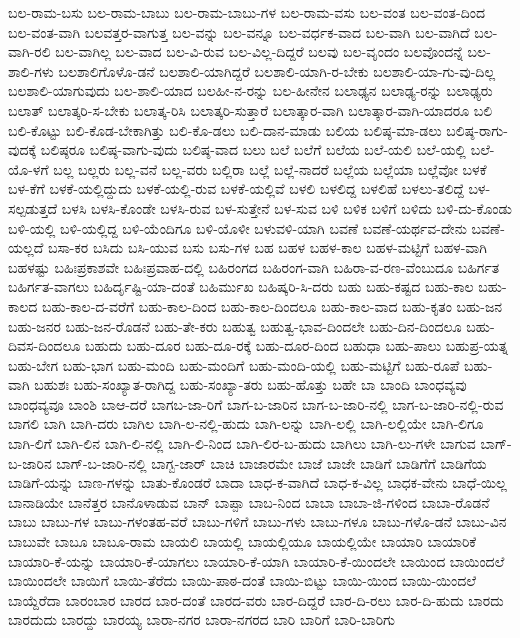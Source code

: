{ಬಲ-ರಾಮ-ಬಸು
ಬಲ-ರಾಮ-ಬಾಬು
ಬಲ-ರಾಮ-ಬಾಬು-ಗಳ
ಬಲ-ರಾಮ-ವಸು
ಬಲ-ವಂತ
ಬಲ-ವಂತ-ದಿಂದ
ಬಲ-ವಂತ-ವಾಗಿ
ಬಲವತ್ತರ-ವಾಗುತ್ತ
ಬಲ-ವನ್ನು
ಬಲ-ವನ್ನೂ
ಬಲ-ವರ್ಧಕ-ವಾದ
ಬಲ-ವಾಗಿ
ಬಲ-ವಾಗಿದೆ
ಬಲ-ವಾಗಿ-ರಲಿ
ಬಲ-ವಾಗಿಲ್ಲ
ಬಲ-ವಾದ
ಬಲ-ವಿ-ರುವ
ಬಲ-ವಿಲ್ಲ-ದಿದ್ದರೆ
ಬಲವು
ಬಲ-ವೃಂದಂ
ಬಲವೊಂದನ್ನೆ
ಬಲ-ಶಾಲಿ-ಗಳು
ಬಲಶಾಲಿಗೊಳೊ-ಡನೆ
ಬಲಶಾಲಿ-ಯಾಗಿದ್ದರೆ
ಬಲಶಾಲಿ-ಯಾಗಿ-ರ-ಬೇಕು
ಬಲಶಾಲಿ-ಯಾ-ಗು-ವು-ದಿಲ್ಲ
ಬಲಶಾಲಿ-ಯಾಗುವುದು
ಬಲ-ಶಾಲಿ-ಯಾದ
ಬಲಹೀ-ನ-ರನ್ನು
ಬಲ-ಹೀನೇನ
ಬಲಾಢ್ಯನ
ಬಲಾಢ್ಯ-ರನ್ನು
ಬಲಾಢ್ಯರು
ಬಲಾತ್
ಬಲಾತ್ಕರಿ-ಸ-ಬೇಕು
ಬಲಾತ್ಕ-ರಿಸಿ
ಬಲಾತ್ಕರಿ-ಸುತ್ತಾರೆ
ಬಲಾತ್ಕಾರ-ವಾಗಿ
ಬಲಾತ್ಕಾರ-ವಾಗಿ-ಯಾದರೂ
ಬಲಿ
ಬಲಿ-ಕೊಟ್ಟು
ಬಲಿ-ಕೊಡ-ಬೇಕಾಗಿತ್ತು
ಬಲಿ-ಕೊ-ಡಲು
ಬಲಿ-ದಾನ-ಮಾಡು
ಬಲಿಯ
ಬಲಿಷ್ಠ-ಮಾ-ಡಲು
ಬಲಿಷ್ಠ-ರಾಗು-ವುದಕ್ಕೆ
ಬಲಿಷ್ಠರೂ
ಬಲಿಷ್ಠ-ವಾಗು-ವುದು
ಬಲಿಷ್ಠ-ವಾದ
ಬಲು
ಬಲೆ
ಬಲೆಗೆ
ಬಲೆಯ
ಬಲೆ-ಯಲಿ
ಬಲೆ-ಯಲ್ಲಿ
ಬಲೆ-ಯೊ-ಳಗೆ
ಬಲ್ಲ
ಬಲ್ಲರು
ಬಲ್ಲ-ವನೆ
ಬಲ್ಲ-ವರು
ಬಲ್ಲಿರಾ
ಬಲ್ಲೆ
ಬಲ್ಲೆ-ನಾದರೆ
ಬಲ್ಲೆಯ
ಬಲ್ಲೆಯಾ
ಬಲ್ಲೆವೋ
ಬಳಕೆ
ಬಳ-ಕೆಗೆ
ಬಳಕೆ-ಯಲ್ಲಿದ್ದುದು
ಬಳಕೆ-ಯಲ್ಲಿ-ರುವ
ಬಳಕೆ-ಯಲ್ಲಿವೆ
ಬಳಲಿ
ಬಳಲಿದ್ದ
ಬಳಲಿಹೆ
ಬಳಲು-ತಲಿದ್ದೆ
ಬಳ-ಸಲ್ಪಡುತ್ತದೆ
ಬಳಸಿ
ಬಳಸಿ-ಕೊಂಡೇ
ಬಳಸಿ-ರುವ
ಬಳ-ಸುತ್ತೇನೆ
ಬಳ-ಸುವ
ಬಳಿ
ಬಳಿಕ
ಬಳಿಗೆ
ಬಳಿದು
ಬಳಿ-ದು-ಕೊಂಡು
ಬಳಿ-ಯಲ್ಲಿ
ಬಳಿ-ಯಲ್ಲಿದ್ದ
ಬಳಿ-ಯೆಂದಿಗೂ
ಬಳಿ-ಯೊಳೀ
ಬಳುವಳಿ-ಯಾಗಿ
ಬವಣೆ
ಬವಣೆ-ಯರ್ಥವ-ದೇನು
ಬವಣೆ-ಯಲ್ಲದೆ
ಬಸಾ-ಕರ
ಬಸಿದು
ಬಸಿ-ಯುವ
ಬಸು
ಬಸು-ಗಳ
ಬಹ
ಬಹಳ
ಬಹಳ-ಕಾಲ
ಬಹಳ-ಮಟ್ಟಿಗೆ
ಬಹಳ-ವಾಗಿ
ಬಹಳಷ್ಟು
ಬಹಿಃಪ್ರಕಾಶವೇ
ಬಹಿಃಪ್ರವಾಹ-ದಲ್ಲಿ
ಬಹಿರಂಗದ
ಬಹಿರಂಗ-ವಾಗಿ
ಬಹಿರಾ-ವ-ರಣ-ವೆಂಬುದೂ
ಬಹಿರ್ಗತ
ಬಹಿರ್ಗತ-ವಾಗಲು
ಬಹಿರ್ದೃಷ್ಟಿ-ಯಾ-ದಂತೆ
ಬಹಿರ್ಮುಖ
ಬಹಿಷ್ಕರಿ-ಸಿ-ದರು
ಬಹು
ಬಹು-ಕಷ್ಟದ
ಬಹು-ಕಾಲ
ಬಹು-ಕಾಲದ
ಬಹು-ಕಾಲ-ದ-ವರೆಗೆ
ಬಹು-ಕಾಲ-ದಿಂದ
ಬಹು-ಕಾಲ-ದಿಂದಲೂ
ಬಹು-ಕಾಲ-ವಾದ
ಬಹು-ಕೃತಂ
ಬಹು-ಜನ
ಬಹು-ಜನರ
ಬಹು-ಜನ-ರೊಡನೆ
ಬಹು-ತೇ-ಕರು
ಬಹುತ್ವ
ಬಹುತ್ವ-ಭಾವ-ದಿಂದಲೇ
ಬಹು-ದಿನ-ದಿಂದಲೂ
ಬಹು-ದಿವಸ-ದಿಂದಲೂ
ಬಹುದು
ಬಹು-ದೂರ
ಬಹು-ದೂ-ರಕ್ಕೆ
ಬಹು-ದೂರ-ದಿಂದ
ಬಹುಧಾ
ಬಹು-ಪಾಲು
ಬಹುಪ್ರ-ಯತ್ನ
ಬಹು-ಬೇಗ
ಬಹು-ಭಾಗ
ಬಹು-ಮಂದಿ
ಬಹು-ಮಂದಿಗೆ
ಬಹು-ಮಂದಿ-ಯಲ್ಲಿ
ಬಹು-ಮಟ್ಟಿಗೆ
ಬಹು-ರೂಪೆ
ಬಹು-ವಾಗಿ
ಬಹುಶಃ
ಬಹು-ಸಂಖ್ಯಾತ-ರಾಗಿದ್ದ
ಬಹು-ಸಂಖ್ಯಾ-ತರು
ಬಹು-ಹೊತ್ತು
ಬಹೇ
ಬಾ
ಬಾಂದಿ
ಬಾಂಧವ್ಯವು
ಬಾಂಧವ್ಯವೂ
ಬಾಂಶಿ
ಬಾಆ-ದರೆ
ಬಾಗಬ-ಜಾ-ರಿಗೆ
ಬಾಗ-ಬ-ಜಾರಿನ
ಬಾಗ-ಬ-ಜಾರಿ-ನಲ್ಲಿ
ಬಾಗ-ಬ-ಜಾರಿ-ನಲ್ಲಿ-ರುವ
ಬಾಗಲಿ
ಬಾಗಿ
ಬಾಗಿ-ದರು
ಬಾಗಿಲ
ಬಾಗಿ-ಲ-ನಲ್ಲಿ-ಹುದು
ಬಾಗಿ-ಲನ್ನು
ಬಾಗಿ-ಲಲ್ಲಿ
ಬಾಗಿ-ಲಲ್ಲಿಯೇ
ಬಾಗಿ-ಲಿಗೂ
ಬಾಗಿ-ಲಿಗೆ
ಬಾಗಿ-ಲಿನ
ಬಾಗಿ-ಲಿ-ನಲ್ಲಿ
ಬಾಗಿ-ಲಿ-ನಿಂದ
ಬಾಗಿ-ಲಿರ-ಬ-ಹುದು
ಬಾಗಿಲು
ಬಾಗಿ-ಲು-ಗಳೇ
ಬಾಗುವ
ಬಾಗ್-ಬ-ಜಾರಿನ
ಬಾಗ್-ಬ-ಜಾರಿ-ನಲ್ಲಿ
ಬಾಗ್ಬ-ಜಾರ್
ಬಾಚಿ
ಬಾಜಾರಮೇ
ಬಾಜೆ
ಬಾಜೇ
ಬಾಡಿಗೆ
ಬಾಡಿಗೆಗೆ
ಬಾಡಿಗೆಯ
ಬಾಡಿಗೆ-ಯನ್ನು
ಬಾಣ-ಗಳನ್ನು
ಬಾತು-ಕೊಂಡರೆ
ಬಾದಾ
ಬಾಧ-ಕ-ವಾಗಿದೆ
ಬಾಧ-ಕ-ವಿಲ್ಲ
ಬಾಧಕ-ವೇನು
ಬಾಧೆ-ಯಿಲ್ಲ
ಬಾನಾಡಿಯೇ
ಬಾನೆತ್ತರ
ಬಾನೊಳಾಡುವ
ಬಾನ್
ಬಾಪ್ಪಾ
ಬಾಬ-ನಿಂದ
ಬಾಬಾ
ಬಾಬಾ-ಜಿ-ಗಳಿಂದ
ಬಾಬಾ-ರೊಡನೆ
ಬಾಬು
ಬಾಬು-ಗಳ
ಬಾಬು-ಗಳಂತಹ-ವರೆ
ಬಾಬು-ಗಳಿಗೆ
ಬಾಬು-ಗಳು
ಬಾಬು-ಗಳೂ
ಬಾಬು-ಗಳೊ-ಡನೆ
ಬಾಬು-ವಿನ
ಬಾಬುವೇ
ಬಾಬೂ
ಬಾಬೂ-ರಾಮ
ಬಾಯಲಿ
ಬಾಯಲ್ಲಿ
ಬಾಯಲ್ಲಿಯೂ
ಬಾಯಲ್ಲಿಯೇ
ಬಾಯಾರಿ
ಬಾಯಾರಿಕೆ
ಬಾಯಾರಿ-ಕೆ-ಯನ್ನು
ಬಾಯಾರಿ-ಕೆ-ಯಾಗಲು
ಬಾಯಾರಿ-ಕೆ-ಯಾಗಿ
ಬಾಯಾರಿ-ಕೆ-ಯಿಂದಲೇ
ಬಾಯಿಂದ
ಬಾಯಿಂದಲೆ
ಬಾಯಿಂದಲೇ
ಬಾಯಿಗೆ
ಬಾಯಿ-ತೆರೆದು
ಬಾಯಿ-ಪಾಠ-ದಂತೆ
ಬಾಯಿ-ಬಿಟ್ಟು
ಬಾಯಿ-ಯಿಂದ
ಬಾಯಿ-ಯಿಂದಲೆ
ಬಾಯ್ದೆರೆದಾ
ಬಾರಂಬಾರ
ಬಾರದ
ಬಾರ-ದಂತೆ
ಬಾರದ-ವರು
ಬಾರ-ದಿದ್ದರೆ
ಬಾರ-ದಿ-ರಲು
ಬಾರ-ದಿ-ಹುದು
ಬಾರದು
ಬಾರದುದು
ಬಾರದ್ದು
ಬಾರಯ್ಯ
ಬಾರಾ-ನಗರ
ಬಾರಾ-ನಗರದ
ಬಾರಿ
ಬಾರಿಗೆ
ಬಾರಿ-ಬಾರಿಗು
}
